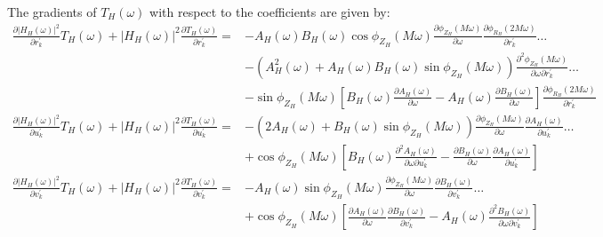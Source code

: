 \documentclass[a4paper,twoside,10pt,english]{report}
\begin{document}
The gradients of $T_{H}\left(\omega\right)$ with respect to the coefficients are
given by:
\begin{align*}
  \frac{\partial\left|H_{H}\left(\omega\right)\right|^{2}}{\partial r^{\prime}_{k}}
  T_{H}\left(\omega\right)+\left|H_{H}\left(\omega\right)\right|^{2}
  \frac{\partial T_{H}\left(\omega\right)}{\partial r^{\prime}_{k}}=
  &-A_{H}\left(\omega\right)B_{H}\left(\omega\right)
    \cos\phi_{Z_{H}}\left(M\omega\right)
    \frac{\partial\phi_{Z_{H}}\left(M\omega\right)}{\partial\omega}
    \frac{\partial\phi_{R_{H}}\left(2M\omega\right)}{\partial r^{\prime}_{k}}
    \hdots\\
  &-\left(A_{H}^{2}\left(\omega\right)+
    A_{H}\left(\omega\right)B_{H}\left(\omega\right)
    \sin\phi_{Z_{H}}\left(M\omega\right)\right)
    \frac{\partial^{2}\phi_{Z_{H}}\left(M\omega\right)}
    {\partial\omega\partial r^{\prime}_{k}} \hdots \\
  &-\sin\phi_{Z_{H}}\left(M\omega\right)\left[B_{H}\left(\omega\right)
    \frac{\partial A_{H}\left(\omega\right)}{\partial\omega}-
    A_{H}\left(\omega\right)\frac{\partial B_{H}\left(\omega\right)}
    {\partial\omega}\right]
    \frac{\partial\phi_{R_{H}}\left(2M\omega\right)}{\partial r^{\prime}_{k}}\\
  \frac{\partial\left|H_{H}\left(\omega\right)\right|^{2}}
  {\partial u^{\prime}_{k}}
  T_{H}\left(\omega\right)+\left|H_{H}\left(\omega\right)\right|^{2}
  \frac{\partial T_{H}\left(\omega\right)}{\partial u^{\prime}_{k}}=
  &-\left(2A_{H}\left(\omega\right)+
    B_{H}\left(\omega\right)\sin\phi_{Z_{H}}\left(M\omega\right)\right)
    \frac{\partial\phi_{Z_{H}}\left(M\omega\right)}{\partial\omega}
    \frac{\partial A_{H}\left(\omega\right)}{\partial u^{\prime}_{k}} \hdots \\
  & +\cos\phi_{Z_{H}}\left(M\omega\right)\left[
    B_{H}\left(\omega\right)\frac{\partial^{2} A_{H}\left(\omega\right)}
    {\partial\omega\partial u^{\prime}_{k}} -
    \frac{\partial B_{H}\left(\omega\right)}{\partial\omega}
    \frac{\partial A_{H}\left(\omega\right)}{\partial u^{\prime}_{k}}\right] \\
  \frac{\partial\left|H_{H}\left(\omega\right)\right|^{2}}
  {\partial v^{\prime}_{k}}
  T_{H}\left(\omega\right)+\left|H_{H}\left(\omega\right)\right|^{2}
  \frac{\partial T_{H}\left(\omega\right)}{\partial v^{\prime}_{k}}=
  &-A_{H}\left(\omega\right)\sin\phi_{Z_{H}}\left(M\omega\right)
    \frac{\partial\phi_{Z_{H}}\left(M\omega\right)}{\partial\omega}
    \frac{\partial B_{H}\left(\omega\right)}{\partial v^{\prime}_{k}} \hdots \\
  &  +\cos\phi_{Z_{H}}\left(M\omega\right)\left[
    \frac{\partial A_{H}\left(\omega\right)}{\partial\omega}
    \frac{\partial B_{H}\left(\omega\right)}{\partial v^{\prime}_{k}}
    -A_{H}\left(\omega\right)\frac{\partial^{2} B_{H}\left(\omega\right)}
    {\partial\omega\partial v^{\prime}_{k}}\right]
\end{align*}
\end{document}
